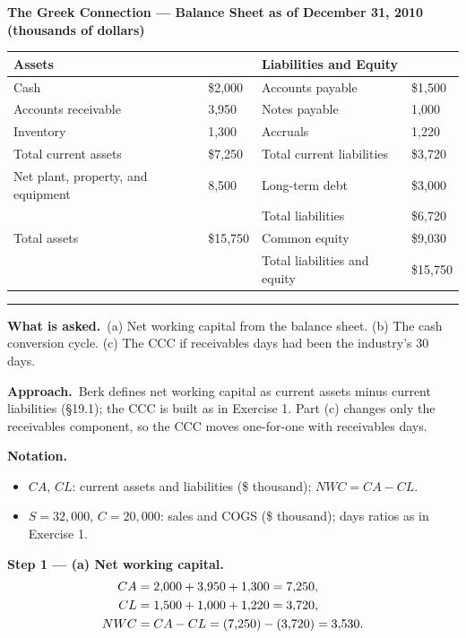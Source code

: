 \documentclass[11pt,a4paper]{article}
\newcommand{\notation}{\par\noindent\textbf{Notation.}}
\newcommand{\step}[2]{\par\medskip\noindent\textbf{Step #1 --- #2.}~}
\newcommand{\asked}{\par\medskip\noindent\textbf{What is asked.}~}
\newcommand{\approach}{\par\smallskip\noindent\textbf{Approach.}~}
\newcommand{\stmtend}{\par\endgroup\nopagebreak\noindent\rule{\linewidth}{0.4pt}\par\medskip}
\begin{document}
\textbf{The Greek Connection --- Balance Sheet as of December 31, 2010 (thousands of dollars)}

{\def\LTcaptype{none} %
\begin{longtable}[]{@{}llll@{}}
\toprule\noalign{}
Assets & & Liabilities and Equity & \\
\midrule\noalign{}
\endhead
\bottomrule\noalign{}
\endlastfoot
Cash & \$2,000 & Accounts payable & \$1,500 \\
Accounts receivable & 3,950 & Notes payable & 1,000 \\
Inventory & 1,300 & Accruals & 1,220 \\
Total current assets & \$7,250 & Total current liabilities & \$3,720 \\
Net plant, property, and equipment & 8,500 & Long-term debt & \$3,000 \\
& & Total liabilities & \$6,720 \\
Total assets & \$15,750 & Common equity & \$9,030 \\
& & Total liabilities and equity & \$15,750 \\
\end{longtable}
}
\stmtend

\asked (a) Net working capital from the balance sheet. (b) The cash conversion cycle. (c) The
CCC if receivables days had been the industry's 30 days.

\approach Berk defines net working capital as current assets minus current liabilities (\S19.1);
the CCC is built as in Exercise 1. Part (c) changes only the receivables component, so the CCC
moves one-for-one with receivables days.

\notation
\begin{itemize}
  \item $CA$, $CL$: current assets and liabilities (\$ thousand); $NWC = CA - CL$.
  \item $S = 32{,}000$, $C = 20{,}000$: sales and COGS (\$ thousand); days ratios as in Exercise 1.
\end{itemize}

\step{1}{(a) Net working capital}
\begin{align}
  CA &= 2{,}000 + 3{,}950 + 1{,}300 = 7{,}250, \notag\\
  CL &= 1{,}500 + 1{,}000 + 1{,}220 = 3{,}720, \notag\\
  NWC &= CA - CL = (7{,}250) - (3{,}720) = 3{,}530. \label{r5be6-nwc}
\end{align}
\end{document}
